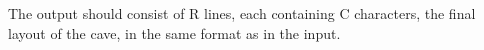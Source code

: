 The output should consist of R lines, each containing C characters, the final layout of the cave, in the same format as in the input.
